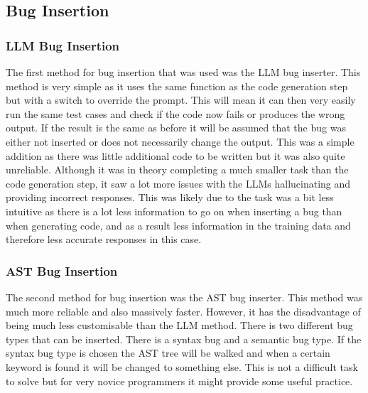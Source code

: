 \documentclass[12pt]{extarticle}
\begin{document}
\subsection{Bug Insertion}
\subsubsection{LLM Bug Insertion}

The first method for bug insertion that was used was the LLM bug inserter. This method is very simple as it uses the same function as the code generation step but with a switch to override the prompt. This will mean it can then very easily run the same test cases and check if the code now fails or produces the wrong output. If the result is the same as before it will be assumed that the bug was either not inserted or does not necessarily change the output. This was a simple addition as there was little additional code to be written but it was also quite unreliable. Although it was in theory completing a much smaller task than the code generation step, it saw a lot more issues with the LLMs hallucinating and providing incorrect responses. This was likely due to the task was a bit less intuitive as there is a lot less information to go on when inserting a bug than when generating code, and as a result less information in the training data and therefore less accurate responses in this case.

\subsubsection{AST Bug Insertion}

The second method for bug insertion was the AST bug inserter. This method was much more reliable and also massively faster. However, it has the disadvantage of being much less customisable than the LLM method. There is two different bug types that can be inserted. There is a syntax bug and a semantic bug type. If the syntax bug type is chosen the AST tree will be walked and when a certain keyword is found it will be changed to something else. This is not a difficult task to solve but for very novice programmers it might provide some useful practice.
\end{document}
